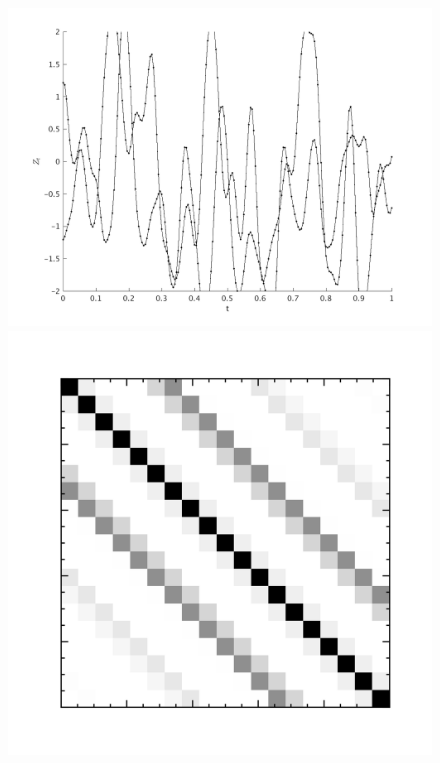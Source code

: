 \begin{figure}
\centering
\includegraphics[scale=.5]{figures/qper2.png}
\includegraphics[scale=.4]{figures/covariancematrix_qper.png}

\end{figure}
